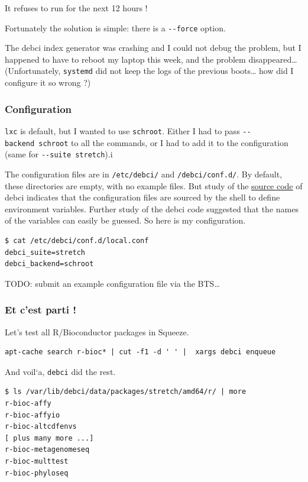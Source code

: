 \documentclass[mingoth,a4paper]{jsarticle}
\begin{document}
It refuses to run for the next 12 hours !

Fortunately the solution is simple: there is a \texttt{-\/-force}
option.

The debci index generator was crashing and I could not debug the
problem, but I happened to have to reboot my laptop this week, and the
problem disappeared\ldots{} (Unfortunately, \texttt{systemd} did not
keep the logs of the previous boots\ldots{} how did I configure it so
wrong ?)

\subsubsection{Configuration}\label{configuration}

\texttt{lxc} is default, but I wanted to use \texttt{schroot}. Either I
had to pass \texttt{-\/-backend\ schroot} to all the commands, or I had
to add it to the configuration (same for \texttt{-\/-suite\ stretch}).i

The configuration files are in \texttt{/etc/debci/} and
\texttt{/debci/conf.d/}. By default, these directories are empty, with
no example files. But study of the
\href{https://github.com/terceiro/debci/blob/master/lib/environment.sh}{source
code} of debci indicates that the configuration files are sourced by the
shell to define environment variables. Further study of the debci code
suggested that the names of the variables can easily be guessed. So here
is my configuration.

\begin{verbatim}
$ cat /etc/debci/conf.d/local.conf 
debci_suite=stretch
debci_backend=schroot
\end{verbatim}

TODO: submit an example configuration file via the BTS\ldots{}

\subsubsection{Et c'est parti !}\label{et-cest-parti}

Let's test all R/Bioconductor packages in Squeeze.

\begin{verbatim}
apt-cache search r-bioc* | cut -f1 -d ' ' |  xargs debci enqueue
\end{verbatim}

And voil`a, \texttt{debci} did the rest.

\begin{verbatim}
$ ls /var/lib/debci/data/packages/stretch/amd64/r/ | more
r-bioc-affy
r-bioc-affyio
r-bioc-altcdfenvs
[ plus many more ...]
r-bioc-metagenomeseq
r-bioc-multtest
r-bioc-phyloseq
\end{verbatim}
\end{document}

